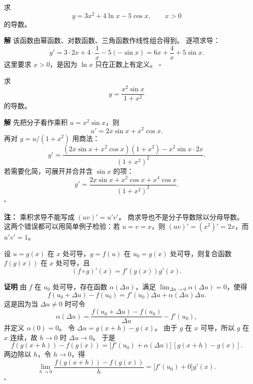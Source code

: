 \documentclass[fontset=fandol]{ctexart}
\newenvironment{proofdetail}{\par\noindent\textbf{证明}\quad}{\hfill$\square$\par\vspace{0.8em}}
\newenvironment{solution}{\par\noindent\textbf{解}\quad}{\hfill$\square$\par\vspace{0.8em}}
\newenvironment{warning}{\par\noindent\textbf{注：}\quad}{\par\vspace{0.8em}}
\newcommand{\dd}{\mathrm{d}}
\begin{document}
\begin{example}[线性组合求导]
求
\[
y=3x^2+4\ln x-5\cos x,\qquad x>0
\]
的导数。
\end{example}
\begin{solution}
该函数由幂函数、对数函数、三角函数作线性组合得到。 逐项求导：
\[
y'=3\cdot 2x+4\cdot\frac1x-5(-\sin x)
=6x+\frac4x+5\sin x.
\]
这里要求 $x>0$，是因为 $\ln x$ 只在正数上有定义。
\end{solution}

\begin{example}[乘积与商的求导]
求
\[
y=\frac{x^2\sin x}{1+x^2}
\]
的导数。
\end{example}
\begin{solution}
先把分子看作乘积 $u=x^2\sin x$，则
\[
u'=2x\sin x+x^2\cos x.
\]
再对 $y=u/(1+x^2)$ 用商法：
\[
y'=\frac{(2x\sin x+x^2\cos x)(1+x^2)-x^2\sin x\cdot2x}{(1+x^2)^2}.
\]
若需要化简，可展开并合并含 $\sin x$ 的项：
\[
y'=\frac{2x\sin x+x^2\cos x+x^4\cos x}{(1+x^2)^2}.
\]
\end{solution}
\begin{warning}
乘积求导不能写成 $(uv)'=u'v'$。 商求导也不是分子导数除以分母导数。 这两个错误都可以用简单例子检验：若 $u=v=x$，则 $(uv)'=(x^2)'=2x$，而 $u'v'=1$。
\end{warning}

\begin{theorem}[复合函数求导法则]
设 $u=g(x)$ 在 $x$ 处可导，$y=f(u)$ 在 $u_0=g(x)$ 处可导，则复合函数 $f(g(x))$ 在 $x$ 处可导，且
\[
(f\circ g)'(x)=f'(g(x))g'(x).
\]
\end{theorem}
\begin{proofdetail}
由 $f$ 在 $u_0$ 处可导，存在函数 $\alpha(\Delta u)$，满足 $\lim_{\Delta u\to0}\alpha(\Delta u)=0$，使得
\[
f(u_0+\Delta u)-f(u_0)=f'(u_0)\Delta u+\alpha(\Delta u)\Delta u.
\]
这是因为当 $\Delta u\neq0$ 时可令
\[
\alpha(\Delta u)=\frac{f(u_0+\Delta u)-f(u_0)}{\Delta u}-f'(u_0),
\]
并定义 $\alpha(0)=0$。 令 $\Delta u=g(x+h)-g(x)$。 由于 $g$ 在 $x$ 可导，所以 $g$ 在 $x$ 连续，故 $h\to0$ 时 $\Delta u\to0$。 于是
\[
f(g(x+h))-f(g(x))
=\bigl[f'(u_0)+\alpha(\Delta u)\bigr]\,[g(x+h)-g(x)].
\]
两边除以 $h$，令 $h\to0$，得
\[
\lim_{h\to0}\frac{f(g(x+h))-f(g(x))}{h}
=\bigl[f'(u_0)+0\bigr]g'(x).
\]
\end{proofdetail}

\begin{center}
\end{center}
\end{document}
